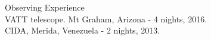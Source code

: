 \documentclass[UTF8]{article}
\begin{document}
{\Large Observing Experience}\\

\indent\indent VATT telescope. Mt Graham, Arizona - 4 nights, 2016.\\
\indent\indent CIDA, Merida, Venezuela - 2 nights, 2013.\\








\end{document}
